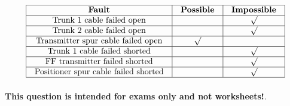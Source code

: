 






$$\vbox{\offinterlineskip
\halign{\strut
\vrule \quad\hfil # \ \hfil & 
\vrule \quad\hfil # \ \hfil & 
\vrule \quad\hfil # \ \hfil \vrule \cr
\noalign{\hrule}
%
{\bf Fault} & {\bf Possible} & {\bf Impossible} \cr
%
\noalign{\hrule}
%
Trunk 1 cable failed open &  & $\surd$ \cr
%
\noalign{\hrule}
%
Trunk 2 cable failed open &  & $\surd$ \cr
%
\noalign{\hrule}
%
Transmitter spur cable failed open & $\surd$ &  \cr
%
\noalign{\hrule}
%
%
%
Trunk 1 cable failed shorted &  & $\surd$ \cr
%
\noalign{\hrule}
%
%
%
FF transmitter failed shorted &  & $\surd$ \cr
%
\noalign{\hrule}
%
%
%
%
%
Positioner spur cable failed shorted &  & $\surd$ \cr
%
\noalign{\hrule}
%
%
} %
}$$ %







{\bf This question is intended for exams only and not worksheets!}.


